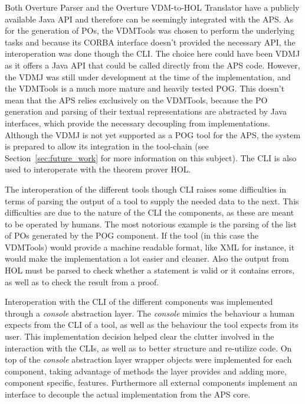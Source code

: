 \documentclass[]{article}
\begin{document}
Both Overture Parser and the Overture VDM-to-HOL Translator have a publicly available Java API and therefore can be seemingly integrated with the APS.
As for the generation of POs, the VDMTools was chosen to perform the underlying tasks and because its CORBA interface doesn't provided the necessary API, the interoperation was done though the CLI.
The choice here could have been VDMJ as it offers a Java API that could be called directly from the APS code.
However, the VDMJ was still under development at the time of the implementation, and the VDMTools is a much more mature and heavily tested POG.
This doesn't mean that the APS relies exclusively on the VDMTools, because the PO generation and parsing of their textual representations are abstracted by Java interfaces, which provide the necessary decoupling from implementations.
Although the VDMJ is not yet supported as a POG tool for the APS, the system is prepared to allow its integration in the tool-chain (see Section~\ref{sec:future_work} for more information on this subject).
The CLI is also used to interoperate with the theorem prover HOL.

The interoperation of the different tools though CLI raises some difficulties in terms of parsing the output of a tool to supply the needed data to the next.
This difficulties are due to the nature of the CLI the components, as these are meant to be operated by humans.
The most notorious example is the parsing of the list of POs generated by the POG component.
If the tool (in this case the VDMTools) would provide a machine readable format, like XML for instance, it would make the implementation a lot easier and cleaner.
Also the output from HOL must be parsed to check whether a statement is valid or it contains errors, as well as to check the result from a  proof.

Interoperation with the CLI of the different components was implemented through a \emph{console} abstraction layer.
The \emph{console} mimics the behaviour a human expects from the CLI of a tool, as well as the behaviour the tool expects from its user.
This implementation decision helped clear the clutter involved in the interaction with the CLIs, as well as to better structure and re-utilize code.
On top of the \emph{console} abstraction layer wrapper objects were implemented for each component, taking advantage of methods the layer provides and adding more, component specific, features.
Furthermore all external components implement an interface to decouple the actual implementation from the APS core.
\end{document}
